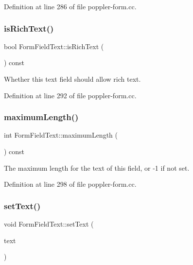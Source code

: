 Definition at line 286 of file poppler-\/form.\+cc.

\mbox{\label{class_poppler_1_1_form_field_text_a3c23b3b6cd48d3ac99e1ed5cf75ad314}} 
\subsubsection{\texorpdfstring{is\+Rich\+Text()}{isRichText()}}
{\footnotesize\ttfamily bool Form\+Field\+Text\+::is\+Rich\+Text (\begin{DoxyParamCaption}{ }\end{DoxyParamCaption}) const}

Whether this text field should allow rich text. 

Definition at line 292 of file poppler-\/form.\+cc.

\mbox{\label{class_poppler_1_1_form_field_text_a7e5ab9c0f4cf21870f61b39caa70b940}} 
\subsubsection{\texorpdfstring{maximum\+Length()}{maximumLength()}}
{\footnotesize\ttfamily int Form\+Field\+Text\+::maximum\+Length (\begin{DoxyParamCaption}{ }\end{DoxyParamCaption}) const}

The maximum length for the text of this field, or -\/1 if not set. 

Definition at line 298 of file poppler-\/form.\+cc.

\mbox{\label{class_poppler_1_1_form_field_text_ab67ad787fc119bdf87281d07339e310c}} 
\subsubsection{\texorpdfstring{set\+Text()}{setText()}}
{\footnotesize\ttfamily void Form\+Field\+Text\+::set\+Text (\begin{DoxyParamCaption}\item[{const Q\+String \&}]{text }\end{DoxyParamCaption})}

